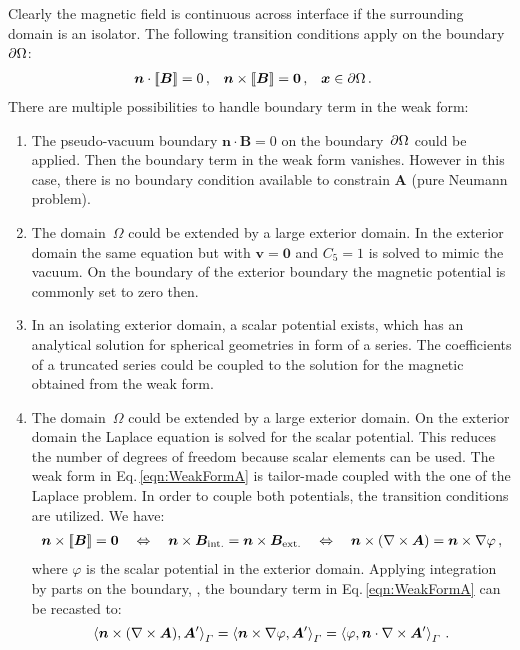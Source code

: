 Clearly the magnetic field is continuous across interface if the surrounding domain is an isolator. The following transition conditions apply on the boundary~$\partial \Omega$:
\begin{equation}\label{eqn:JumpCondition}
\begin{aligned}
	\bm{n}\cdot\left[\!\left[\bm{B}\right]\!\right]&=0\,, &
	\bm{n}\times\left[\!\left[\bm{B}\right]\!\right]&=\bm{0}\,, &
	\bm{x}&\in\partial\Omega\,.
\end{aligned}
\end{equation}
There are multiple possibilities to handle boundary term in the weak form: 
\begin{enumerate}
	\item The pseudo-vacuum boundary $\bm{n}\cdot\bm{B}=0$ on the boundary~$\partial\Omega$ could be applied. Then the boundary term in the weak form vanishes. However in this case, there is no boundary condition available to constrain $\bm{A}$ (pure Neumann problem).
	\item The domain~$\Omega$ could be extended by a large exterior domain. In the exterior domain the same equation but with $\bm{v}=\bm{0}$ and $C_5=1$ is solved to mimic the vacuum. On the boundary of the exterior boundary the magnetic potential is commonly set to zero then.
	\item In an isolating exterior domain, a scalar potential exists, which has an analytical solution for spherical geometries in form of a series. The coefficients of a truncated series could be coupled to the solution for the magnetic obtained from the weak form.
	\item The domain~$\Omega$ could be extended by a large exterior domain. On the exterior domain the Laplace equation is solved for the scalar potential. This reduces the number of degrees of freedom because scalar elements can be used. The weak form in Eq.\,\eqref{eqn:WeakFormA} is tailor-made coupled with the one of the Laplace problem. In order to couple both potentials, the transition conditions are utilized. We have:
	\begin{gather}
		\bm{n}\times\left[\!\left[\bm{B}\right]\!\right]=\bm{0}\quad \Leftrightarrow \quad \bm{n}\times\bm{B}_\mathrm{int.}=\bm{n}\times\bm{B}_\mathrm{ext.} \quad \Leftrightarrow \quad \bm{n}\times(\nabla\times\bm{A})=\bm{n}\times\nabla\varphi\,,
	\end{gather}
	where $\varphi$ is the scalar potential in the exterior domain. Applying integration by parts on the boundary, \cite[58\psq]{Monk2003}, the boundary term in Eq.\,\eqref{eqn:WeakFormA} can be recasted to:
	\begin{equation}
		\left\langle\bm{n}\times(\nabla\times\bm{A}),\bm{A}'\right\rangle_{\varGamma}
		=\left\langle\bm{n}\times\nabla\varphi,\bm{A}'\right\rangle_{\varGamma}
		=\left\langle\varphi,\bm{n}\cdot\nabla\times\bm{A}'\right\rangle_{\varGamma}\,.
	\end{equation}


\end{enumerate}
